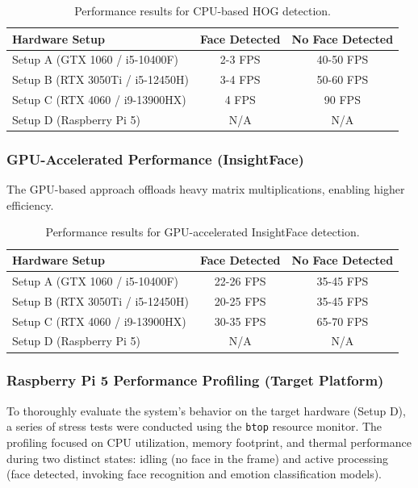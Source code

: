 \documentclass{article}
\begin{document}
\begin{table}[H]
    \centering
    \begin{tabular}{|l|c|c|}
        \hline
        \textbf{Hardware Setup} & \textbf{Face Detected} & \textbf{No Face Detected} \\
        \hline
        Setup A (GTX 1060 / i5-10400F) & 2-3 FPS & 40-50 FPS \\
        Setup B (RTX 3050Ti / i5-12450H) & 3-4 FPS & 50-60 FPS \\
        Setup C (RTX 4060 / i9-13900HX) & 4 FPS & 90 FPS \\
        Setup D (Raspberry Pi 5) & N/A & N/A \\
        \hline
    \end{tabular}
    \caption{Performance results for CPU-based HOG detection.}
    \label{tab:fps_hog}
\end{table}

\subsubsection{GPU-Accelerated Performance (InsightFace)}
The GPU-based approach offloads heavy matrix multiplications, enabling higher efficiency.

\begin{table}[H]
    \centering
    \begin{tabular}{|l|c|c|}
        \hline
        \textbf{Hardware Setup} & \textbf{Face Detected} & \textbf{No Face Detected} \\
        \hline
        Setup A (GTX 1060 / i5-10400F) & 22-26 FPS & 35-45 FPS \\
        Setup B (RTX 3050Ti / i5-12450H) & 20-25 FPS & 35-45 FPS \\
        Setup C (RTX 4060 / i9-13900HX) & 30-35 FPS & 65-70 FPS \\
        Setup D (Raspberry Pi 5) & N/A & N/A \\
        \hline
    \end{tabular}
    \caption{Performance results for GPU-accelerated InsightFace detection.}
    \label{tab:fps_insightface}
\end{table}

\subsubsection{Raspberry Pi 5 Performance Profiling (Target Platform)}
To thoroughly evaluate the system's behavior on the target hardware (Setup D), a series of stress tests were conducted using the \texttt{btop} resource monitor. The profiling focused on CPU utilization, memory footprint, and thermal performance during two distinct states: idling (no face in the frame) and active processing (face detected, invoking face recognition and emotion classification models).
\end{document}
